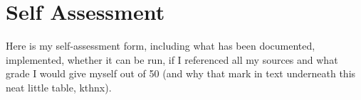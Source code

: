 \documentclass[12pt]{article}
\begin{document}


\clearpage

\section{Self Assessment}
Here is my self-assessment form, including what has been documented, implemented, whether it can be run, if I referenced all my sources and what grade I would give myself out of 50 (and why that mark in text underneath this neat little table, kthnx).


\clearpage

\end{document}
